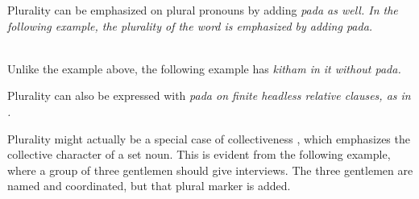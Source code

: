 Plurality can be emphasized on plural pronouns by adding \em pada \em as well. In the following example, the plurality of the word  is emphasized by adding \em pada\em.

 \\
Unlike the example above, the following example has \em kitham \em in it without \em pada\em.



%
%

Plurality can also be expressed with \em pada \em on finite headless relative clauses, as in .



Plurality might actually be a special case of collectiveness \citep{Rijkhoff2002}, which emphasizes the collective character of a set noun. This is evident from the following example, where a group of three gentlemen should give interviews. The three gentlemen are named and coordinated, but that plural marker is added.




